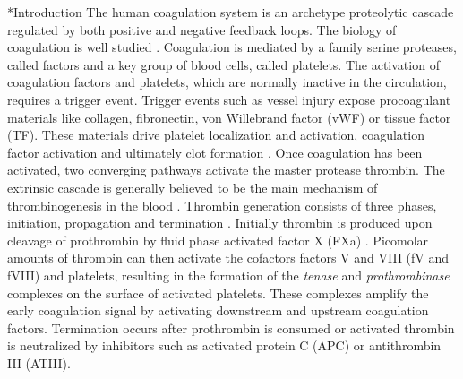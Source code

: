 \documentclass[12pt]{article}
\makeatletter
\renewcommand\section{\@startsection
	{subsection}{2}{0mm}
	{-0.2in}
	{0.05\baselineskip}
	{\normalfont\large\bfseries}}
\makeatother
\begin{document}
\section*{Introduction}
The human coagulation system is an archetype proteolytic cascade regulated by both positive and negative feedback loops.
The biology of coagulation is well studied \cite{ROBERTS1998,MANN1999,BUTENAS2002,FURIE2004}. 
Coagulation is mediated by a family serine proteases, called factors and a key group of blood cells, called platelets. 
The activation of coagulation factors and platelets, which are normally inactive in the circulation, requires a trigger event.
Trigger events such as vessel injury expose procoagulant materials like collagen, fibronectin, von Willebrand factor (vWF) or tissue factor (TF).
These materials drive platelet localization and activation, coagulation factor activation and ultimately clot formation \cite{GIESEN1999}.  
Once coagulation has been activated, two converging pathways activate the master protease thrombin. 
The extrinsic cascade is generally believed to be the main mechanism of thrombinogenesis in the blood \cite{MANN1990,ROBERTS1998,MANN1999}.
Thrombin generation consists of three phases, initiation, propagation and termination \cite{GOLDHABER2006, BRUMMEL2002}.  
Initially thrombin is produced upon cleavage of prothrombin by fluid phase activated factor X (FXa) \cite{BUTENAS2002a}. 
Picomolar amounts of thrombin can then activate the cofactors factors V and VIII (fV and fVIII) and platelets, 
resulting in the formation of the \emph{tenase} and \emph{prothrombinase} complexes on the surface of activated platelets.
These complexes amplify the early coagulation signal by activating downstream and upstream coagulation factors.  
Termination occurs after prothrombin is consumed or activated thrombin is neutralized by inhibitors such as activated protein C (APC) or antithrombin III (ATIII).   
\end{document}
